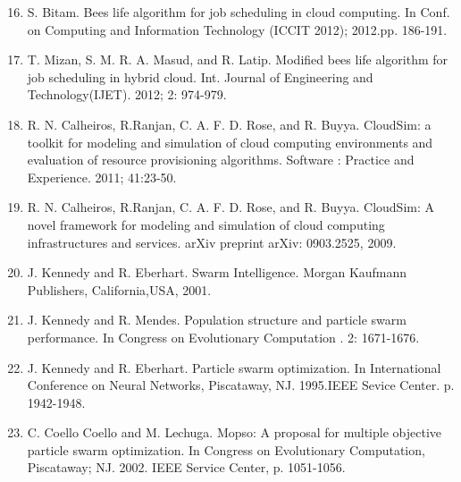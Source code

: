 \documentclass[10pt]{article}
\begin{document}
\begin{enumerate}
  \setcounter{enumi}{15}
  \item S. Bitam. Bees life algorithm for job scheduling in cloud computing. In Conf. on Computing and Information Technology (ICCIT 2012); 2012.pp. 186-191.

  \item T. Mizan, S. M. R. A. Masud, and R. Latip. Modified bees life algorithm for job scheduling in hybrid cloud. Int. Journal of Engineering and Technology(IJET). 2012; 2: 974-979.

  \item R. N. Calheiros, R.Ranjan, C. A. F. D. Rose, and R. Buyya. CloudSim: a toolkit for modeling and simulation of cloud computing environments and evaluation of resource provisioning algorithms. Software : Practice and Experience. 2011; 41:23-50.

  \item R. N. Calheiros, R.Ranjan, C. A. F. D. Rose, and R. Buyya. CloudSim: A novel framework for modeling and simulation of cloud computing infrastructures and services. arXiv preprint arXiv: 0903.2525, 2009.

  \item J. Kennedy and R. Eberhart. Swarm Intelligence. Morgan Kaufmann Publishers, California,USA, 2001.

  \item J. Kennedy and R. Mendes. Population structure and particle swarm performance. In Congress on Evolutionary Computation . 2: 1671-1676.

  \item J. Kennedy and R. Eberhart. Particle swarm optimization. In International Conference on Neural Networks, Piscataway, NJ. 1995.IEEE Sevice Center. p. 1942-1948.

  \item C. Coello Coello and M. Lechuga. Mopso: A proposal for multiple objective particle swarm optimization. In Congress on Evolutionary Computation, Piscataway; NJ. 2002. IEEE Service Center, p. 1051-1056.

\end{enumerate}
\end{document}
